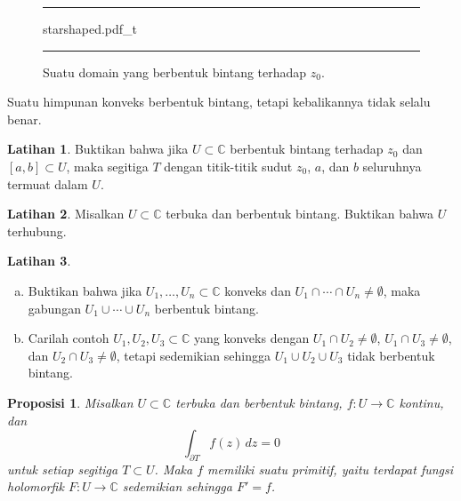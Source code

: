 \documentclass[12pt,openany]{book}
\newcommand{\C}{{\mathbb{C}}}
\theoremstyle{plain}
\newtheorem{prop}[thm]{Proposisi}
\theoremstyle{remark}
\theoremstyle{definition}
\newenvironment{exbox}{%
    \def\FrameCommand{\vrule width 1pt \relax\hspace{10pt}}%
    \MakeFramed{\advance\hsize-\width\FrameRestore}%
}{%
    \endMakeFramed
}
\newenvironment{exparts}{%
    \leavevmode\begin{enumerate}[a),noitemsep,topsep=0pt,parsep=0pt,partopsep=0pt]
}{%
    \end{enumerate}
}
\newenvironment{myfig}{%
\begin{figure}[h!t]
\noindent\rule{\textwidth}{0.5pt}\vspace{12pt}\par\centering}%
{\par\noindent\rule{\textwidth}{0.5pt}
\end{figure}}
\theoremstyle{exercise}
\newtheorem{exercise}{Latihan}[section]
\theoremstyle{example}
\begin{document}
\begin{myfig}
{starshaped.pdf_t}
\caption{Suatu domain yang berbentuk bintang terhadap $z_0$.\label{fig:starshaped}}
\end{myfig}

Suatu himpunan konveks berbentuk bintang, tetapi kebalikannya tidak selalu benar.

\begin{exbox}
\begin{exercise}%
\label{exercise:triangleinstarlike}
Buktikan bahwa jika $U \subset \C$ berbentuk bintang terhadap $z_0$ dan $[a,b]
\subset U$, maka segitiga $T$ dengan titik-titik sudut $z_0$, $a$, dan $b$ seluruhnya
termuat dalam $U$.
\end{exercise}

\begin{exercise}
Misalkan $U \subset \C$ terbuka dan berbentuk bintang.  Buktikan bahwa $U$ terhubung.
\end{exercise}

\begin{exercise}
\begin{exparts}
\item
Buktikan bahwa jika $U_1,\ldots,U_n \subset \C$ konveks dan $U_1 \cap 
\cdots \cap U_n \neq \emptyset$, maka gabungan $U_1 \cup \cdots \cup U_n$
berbentuk bintang.
\item
Carilah contoh $U_1,U_2,U_3 \subset \C$ yang konveks dengan
$U_1 \cap U_2 \neq \emptyset$,
$U_1 \cap U_3 \neq \emptyset$, dan
$U_2 \cap U_3 \neq \emptyset$, tetapi sedemikian sehingga $U_1 \cup U_2 \cup U_3$
tidak berbentuk bintang.
\end{exparts}
\end{exercise}
\end{exbox}

\begin{prop} \label{prop:primitiveinstarlike1}
Misalkan $U \subset \C$ terbuka dan berbentuk bintang,
$f \colon U \to \C$ kontinu, dan
\begin{equation*}
\int_{\partial T} f(z) \, dz = 0
\end{equation*}
untuk setiap segitiga $T \subset U$.
Maka $f$ memiliki suatu primitif, yaitu
terdapat fungsi holomorfik $F \colon U \to \C$
sedemikian sehingga $F' = f$.
\end{prop}
\end{document}
